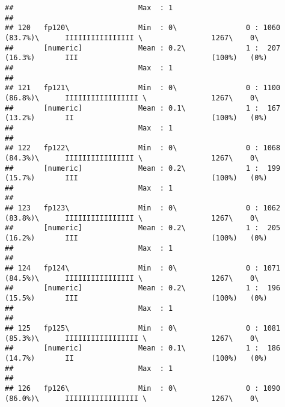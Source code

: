 \documentclass[]{article}
\begin{document}
\begin{verbatim}
##                             Max  : 1                                                                                            
## 
## 120   fp120\                Min  : 0\                0 : 1060 (83.7%)\      IIIIIIIIIIIIIIII \                1267\    0\       
##       [numeric]             Mean : 0.2\              1 :  207 (16.3%)       III                               (100%)   (0%)     
##                             Max  : 1                                                                                            
## 
## 121   fp121\                Min  : 0\                0 : 1100 (86.8%)\      IIIIIIIIIIIIIIIII \               1267\    0\       
##       [numeric]             Mean : 0.1\              1 :  167 (13.2%)       II                                (100%)   (0%)     
##                             Max  : 1                                                                                            
## 
## 122   fp122\                Min  : 0\                0 : 1068 (84.3%)\      IIIIIIIIIIIIIIII \                1267\    0\       
##       [numeric]             Mean : 0.2\              1 :  199 (15.7%)       III                               (100%)   (0%)     
##                             Max  : 1                                                                                            
## 
## 123   fp123\                Min  : 0\                0 : 1062 (83.8%)\      IIIIIIIIIIIIIIII \                1267\    0\       
##       [numeric]             Mean : 0.2\              1 :  205 (16.2%)       III                               (100%)   (0%)     
##                             Max  : 1                                                                                            
## 
## 124   fp124\                Min  : 0\                0 : 1071 (84.5%)\      IIIIIIIIIIIIIIII \                1267\    0\       
##       [numeric]             Mean : 0.2\              1 :  196 (15.5%)       III                               (100%)   (0%)     
##                             Max  : 1                                                                                            
## 
## 125   fp125\                Min  : 0\                0 : 1081 (85.3%)\      IIIIIIIIIIIIIIIII \               1267\    0\       
##       [numeric]             Mean : 0.1\              1 :  186 (14.7%)       II                                (100%)   (0%)     
##                             Max  : 1                                                                                            
## 
## 126   fp126\                Min  : 0\                0 : 1090 (86.0%)\      IIIIIIIIIIIIIIIII \               1267\    0\       

\end{verbatim}
\end{document}
